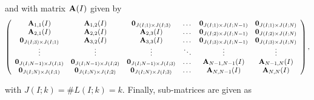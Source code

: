 \documentclass[preprint,12pt]{elsarticle}
\begin{document}
\par\noindent and with matrix ${\bf A}(I)$ given by
\begin{equation*}
  \left(\begin{array}{cccccc}
{\bf A}_{1,1}(I) & {\bf A}_{1,2}(I) & {\bf 0}_{J(I;1)\times J(I;3)} & \dots & {\bf 0}_{J(I;1)\times J(I;N-1)} & {\bf 0}_{J(I;1)\times J(I;N)}\\
{\bf A}_{2,1}(I) & {\bf A}_{2,2}(I) & {\bf A}_{2,3}(I) & \dots & {\bf 0}_{J(I;2)\times J(I;N-1)} & {\bf 0}_{J(I;2)\times J(I;N)}\\
{\bf 0}_{J(I;3)\times J(I;1)} & {\bf A}_{3,2}(I) & {\bf A}_{3,3}(I) & \dots & {\bf 0}_{J(I;3)\times J(I;N-1)} & {\bf 0}_{J(I;3)\times J(I;N)}\\
\vdots & \vdots & \vdots & \ddots & \vdots & \vdots\\
{\bf 0}_{J(I;N-1)\times J(I;1)} & {\bf 0}_{J(I;N-1)\times J(I;2)} & {\bf 0}_{J(I;N-1)\times J(I;3)} & \dots & {\bf A}_{N-1,N-1}(I) & {\bf A}_{N-1,N}(I) \\
{\bf 0}_{J(I;N)\times J(I;1)} & {\bf 0}_{J(I;N)\times J(I;2)} & {\bf 0}_{J(I;N)\times J(I;3)} & \dots & {\bf A}_{N,N-1}(I) & {\bf A}_{N,N}(I)
                        \end{array}\right),
\end{equation*}
\par\noindent with $J(I;k)=\#L(I;k)=k$. Finally, sub-matrices are given as
\end{document}
